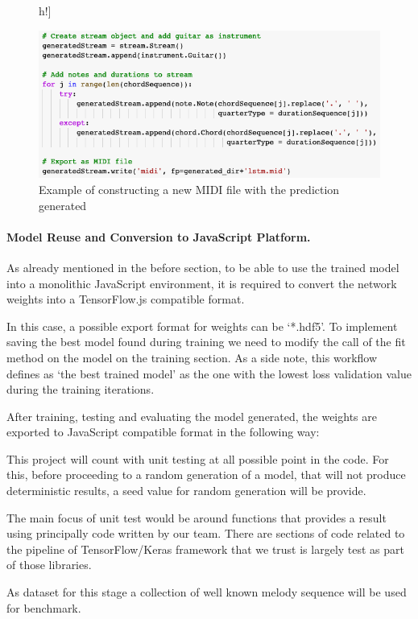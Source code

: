 \begin{figure}[]h!]
  \caption{Example of constructing a new MIDI file with the prediction generated}
  \includegraphics[width=\linewidth]{image/fig_JDF25.png}
\end{figure}


\paragraph{Model Reuse and Conversion to JavaScript Platform.} As already mentioned in the
before section, to be able to use the trained model into a monolithic JavaScript
environment, it is required to convert the network weights into a TensorFlow.js compatible
format.

In this case, a possible export format for weights can be ‘*.hdf5’. To implement saving
the best model found during training we need to modify the call of the fit method on the
model on the training section. As a side note, this workflow defines as ‘the best trained
model’ as the one with the lowest loss validation value during the training iterations.

After training, testing and evaluating the model generated, the weights are exported to
JavaScript compatible format in the following way:

This project will count with unit testing at all possible point in the code. For this,
before proceeding to a random generation of a model, that will not produce deterministic
results, a seed value for random generation will be provide.

The main focus of unit test would be around functions that provides a result using
principally code written by our team. There are sections of code related to the pipeline
of TensorFlow/Keras framework that we trust is largely test as part of those libraries.

As dataset for this stage a collection of well known melody sequence will be used for
benchmark.

